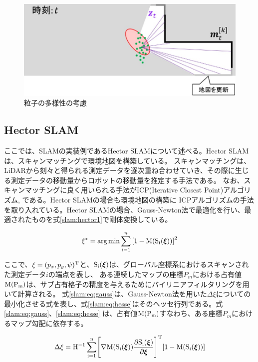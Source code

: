 \begin{figure}[h]
  \begin{center}
  \includegraphics[width=.8\linewidth]{img/slam_20.jpg}
  \caption{粒子の多様性の考慮}
  \label{slam:sample_tayou}
  \end{center}
\end{figure}

\clearpage
\subsection{Hector SLAM}
ここでは、SLAMの実装例であるHector SLAMについて述べる。Hector SLAMは、スキャンマッチングで環境地図を構築している。
スキャンマッチングは、LiDARから刻々と得られる測定データを逐次重ね合わせていき、その際に生じる測定データの移動量からロボットの移動量を推定する手法である。
なお、スキャンマッチングに良く用いられる手法がICP(Iterative Closest Point)アルゴリズム\cite{slam:masuda}, \cite{slam:icp}である。Hector SLAMの場合も環境地図の構築に
ICPアルゴリズムの手法を取り入れている。Hector SLAMの場合、Gauss-Newton法で最適化を行い、最適されたものを式\eqref{slam:hector1}で剛体変換している。

\begin{align}
  \xi^{*} = \arg\min\sum_{i = 1}^{n} \left[1-\rm{M}(\rm{\bm{S}}_i(\bm{\xi}))\right]^2 \label{slam:hector1}
\end{align}

ここで、$\xi=(p_x,p_y,\psi)^{\rm{T}}$と、$\rm{\bm{S}}_i(\bm{\xi})$は、グローバル座標系におけるスキャンされた測定データ$i$の端点を表し、
ある連続したマップの座標$P_m$における占有値$\rm{M}(P_m)$は、サブ占有格子の精度を与えるためにバイリニアフィルタリングを用いて計算される。
式\ref{slam:eq:gauss}は、Gauss-Newton法を用いた$\Delta\xi$についての最小化させる式を表し、式\eqref{slam:eq:hesse}はそのヘッセ行列である。式\eqref{slam:eq:gauss}、\eqref{slam:eq:hesse}
は、占有値$\rm{M}(P_m)$すなわち、ある座標$P_m$におけるマップ勾配に依存する。

\begin{align}
  \Delta\xi = \rm{H}^{-1}\sum_{i = 1}^{n}\Biggl[\nabla M(S_i(\bm{\xi}))\frac{\partial\rm{S}_i(\bm{\xi})}{\partial\bm{\xi}}\Biggr]^{\rm{T}}[1-M(\rm{S}_i(\bm{\xi}))] \label{slam:eq:gauss}
\end{align}


